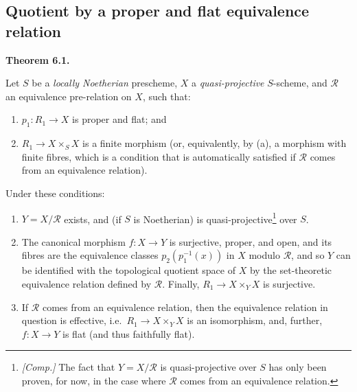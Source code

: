 \documentclass{article}
\providecommand{\tightlist}{%
  \setlength{\itemsep}{0pt}\setlength{\parskip}{0pt}}
\newenvironment{itenv}[1]
  {\phantomsection\par\smallskip\noindent\textbf{#1.}\itshape}
  {\par\smallskip}
\newcommand{\oldpage}[1]{\marginpar{\footnotesize$\Big\vert$ \textit{p.~#1}}}
\theoremstyle{definition}
\theoremstyle{definition}
\theoremstyle{definition}
\theoremstyle{definition}
\theoremstyle{remark}
\begin{document}
\hypertarget{fga-3-iii-section-6}{%
\subsection{Quotient by a proper and flat equivalence relation}\label{fga-3-iii-section-6}}

\hypertarget{fga-3-iii-theorem-6.1}{}
\begin{itenv}{Theorem 6.1}

\oldpage{212-15}Let \(S\) be a \emph{locally Noetherian} prescheme, \(X\) a \emph{quasi-projective} \(S\)-scheme, and \({\mathcal{R}}\) an equivalence pre-relation on \(X\), such that:

\begin{enumerate}
\def\labelenumi{\alph{enumi}.}
\tightlist
\item
  \(p_1\colon R_1\to X\) is proper and flat; and
\item
  \(R_1\to X\times_S X\) is a finite morphism (or, equivalently, by (a), a morphism with finite fibres, which is a condition that is automatically satisfied if \({\mathcal{R}}\) comes from an equivalence relation).
\end{enumerate}

Under these conditions:

\begin{enumerate}
\def\labelenumi{\roman{enumi}.}
\item
  \(Y=X/{\mathcal{R}}\) exists, and (if \(S\) is Noetherian) is quasi-projective\footnote{\emph{{[}Comp.{]}} The fact that \(Y=X/{\mathcal{R}}\) is quasi-projective over \(S\) has only been proven, for now, in the case where \({\mathcal{R}}\) comes from an equivalence relation.} over \(S\).
\item
  The canonical morphism \(f\colon X\to Y\) is surjective, proper, and open, and its fibres are the equivalence classes \(p_2(p_1^{-1}(x))\) in \(X\) modulo \({\mathcal{R}}\), and so \(Y\) can be identified with the topological quotient space of \(X\) by the set-theoretic equivalence relation defined by \({\mathcal{R}}\).
  Finally, \(R_1\to X\times_Y X\) is surjective.
\item
  If \({\mathcal{R}}\) comes from an equivalence relation, then the equivalence relation in question is effective, i.e.~\(R_1\to X\times_Y X\) is an isomorphism, and, further, \(f\colon X\to Y\) is flat (and thus faithfully flat).
\end{enumerate}

\end{itenv}
\end{document}
